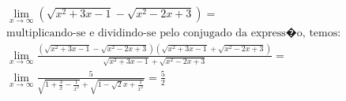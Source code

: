 \begin{ex}
\begin{align}
&\lim_{x\rightarrow \infty} (\sqrt{x^2+3x-1}-\sqrt{x^2-2x+3})=\nonumber\\
&\text{multiplicando-se e dividindo-se pelo conjugado da express�o, temos:}\nonumber\\
&\lim_{x\rightarrow \infty} \frac{(\sqrt{x^2+3x-1}-\sqrt{x^2-2x+3})(\sqrt{x^2+3x-1}+\sqrt{x^2-2x+3})}{\sqrt{x^2+3x-1}+\sqrt{x^2-2x+3}}=\nonumber\\
&\lim_{x\rightarrow \infty} \frac{5}{\sqrt{1+\frac{3}{x}-\frac{1}{x^2}}+\sqrt{1-\sqrt{2}{x}+\frac{1}{x^2}}}=\frac{5}{2}\nonumber
\end{align}
\end{ex}